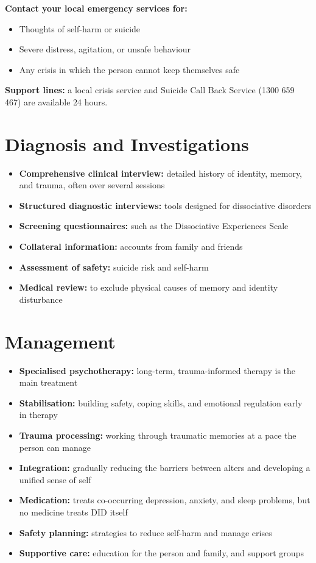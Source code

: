\textbf{Contact your local emergency services for:}
\begin{itemize}
    \item Thoughts of self-harm or suicide
    \item Severe distress, agitation, or unsafe behaviour
    \item Any crisis in which the person cannot keep themselves safe
\end{itemize}
\textbf{Support lines:} a local crisis service and Suicide Call Back Service (1300 659 467) are available 24 hours.

\section*{Diagnosis and Investigations}
\begin{itemize}
    \item \textbf{Comprehensive clinical interview:} detailed history of identity, memory, and trauma, often over several sessions
    \item \textbf{Structured diagnostic interviews:} tools designed for dissociative disorders
    \item \textbf{Screening questionnaires:} such as the Dissociative Experiences Scale
    \item \textbf{Collateral information:} accounts from family and friends
    \item \textbf{Assessment of safety:} suicide risk and self-harm
    \item \textbf{Medical review:} to exclude physical causes of memory and identity disturbance
\end{itemize}

\section*{Management}
\begin{itemize}
    \item \textbf{Specialised psychotherapy:} long-term, trauma-informed therapy is the main treatment
    \item \textbf{Stabilisation:} building safety, coping skills, and emotional regulation early in therapy
    \item \textbf{Trauma processing:} working through traumatic memories at a pace the person can manage
    \item \textbf{Integration:} gradually reducing the barriers between alters and developing a unified sense of self
    \item \textbf{Medication:} treats co-occurring depression, anxiety, and sleep problems, but no medicine treats DID itself
    \item \textbf{Safety planning:} strategies to reduce self-harm and manage crises
    \item \textbf{Supportive care:} education for the person and family, and support groups
\end{itemize}

